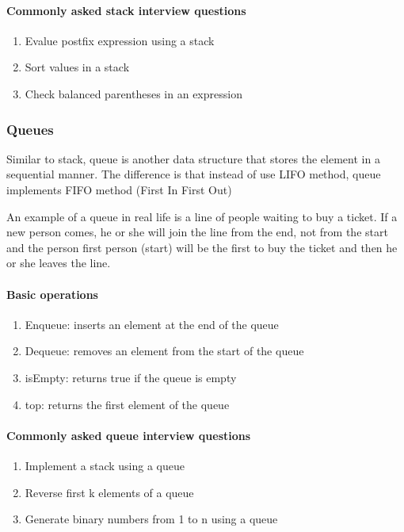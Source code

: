 \paragraph{Commonly asked stack interview questions}
\begin{enumerate}
    \item { Evalue postfix expression using a stack }
    \item { Sort values in a stack }
    \item { Check balanced parentheses in an expression }
\end{enumerate}

\subsubsection{Queues}
Similar to stack, queue is another data structure that stores the element in a sequential manner. The difference is that instead of use LIFO method, queue implements FIFO method (First In First Out)

An example of a queue in real life is a line of people waiting to buy a ticket. If a new person comes, he or she will join the line from the end, not from the start and the person first person (start) will be the first to buy the ticket and then he or she leaves the line.

\paragraph{Basic operations}
\begin{enumerate}
    \item { Enqueue: inserts an element at the end of the queue}
    \item { Dequeue: removes an element from the start of the queue }
    \item { isEmpty: returns true if the queue is empty }
    \item { top: returns the first element of the queue }
\end{enumerate}

\paragraph{Commonly asked queue interview questions}
\begin{enumerate}
    \item { Implement a stack using a queue }
    \item { Reverse first k elements of a queue }
    \item { Generate binary numbers from 1 to n using a queue }
\end{enumerate}


